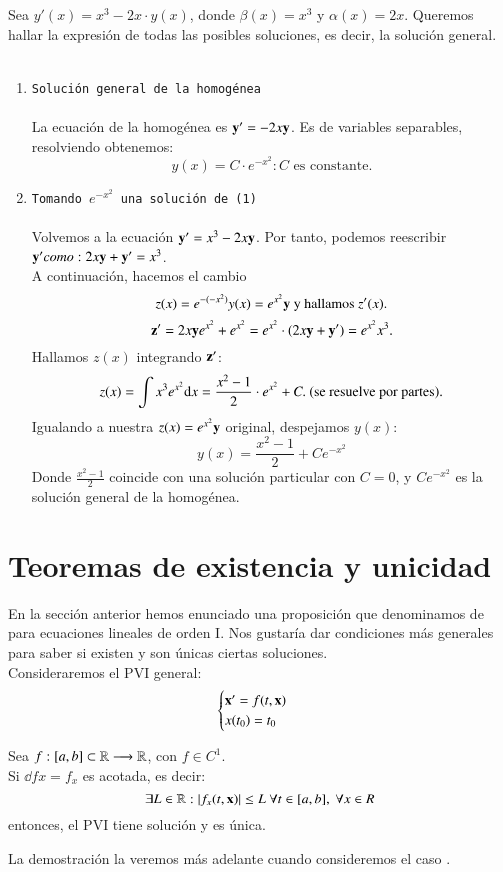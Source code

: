 \begin{eg}
    Sea $y'(x) = x^3 - 2x\cdot y(x)$, donde $\beta(x) = x^3$ y $\alpha(x) = 2x$. Queremos hallar la expresión de todas las posibles soluciones, es decir, la solución general.\\\\
    \begin{enumerate}
        \item \texttt{Solución general de la homogénea}\\\\
        La ecuación de la homogénea es $\mathbf{y}'=-2x\mathbf{y}$. Es de variables separables, resolviendo obtenemos:
        $$
            y(x) = C \cdot e^{-x^2} : C \text{ es constante.}
        $$
        \item \texttt{Tomando $e^{-x^2}$ una solución de (1)}\\\\
        Volvemos a la ecuación $\mathbf{y}' = x^3-2x\mathbf{y}$. Por tanto, podemos reescribir $\mathbf{y}' como: 2x\mathbf{y} + \mathbf{y}' = x^3$.\\
        A continuación, hacemos el cambio
        $$
            z(x) = e^{-(-x^2)} y(x) = e^{x^2} \mathbf{y} \text{ y hallamos $z'(x)$.}
        $$
        $$
            \mathbf{z}' = 2x\mathbf{y}e^{x^2} + e^{x^2} = e^{x^2}\cdot (2x\mathbf{y}+\mathbf{y}') = e^{x^2} x^3.
        $$
        Hallamos $z(x)$ integrando $\mathbf{z}'$:
        $$
            z(x) = \int x^3 e^{x^2} \mathrm{d} x = \frac{x^2-1}{2} \cdot e^{x^2} + C.\text{ (se resuelve por partes).}
        $$
        Igualando a nuestra $z(x) = e^{x^2} \mathbf{y}$ original, despejamos $y(x)$:
        $$
            y(x) = \frac{x^2-1}{2} + C e^{-x^2}
        $$
        Donde $\frac{x^2-1}{2}$ coincide con una solución particular con $C = 0$, y $C e^{-x^2}$ es la solución general de la homogénea.
    \end{enumerate}
\end{eg}
\section{Teoremas de existencia y unicidad}
En la sección anterior hemos enunciado una proposición que denominamos de  para ecuaciones lineales de orden I. Nos gustaría dar condiciones más generales para saber si existen y son únicas ciertas soluciones.\\
Consideraremos el PVI general:
$$
    \begin{cases}
        \mathbf{x'} = f(t, \mathbf{x}) \\ x(t_0) = t_0
    \end{cases}
$$
\begin{thm}
    Sea $f: [a,b] \subset \mathbb{R} \longrightarrow \mathbb{R}$, con $f \in C^1$.\\Si $\dd{f}{x} = f_x$ es acotada,  es decir:
    $$
        \exists L \in \mathbb{R} : |f_x(t, \mathbf{x})| \leq L\ \forall t\in[a,b],\ \forall x\in R
    $$ entonces, el PVI tiene solución y es única.
\end{thm}
La demostración la veremos más adelante cuando consideremos el caso .

